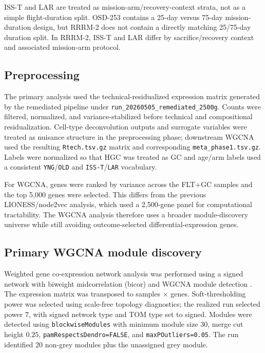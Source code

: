 \documentclass[11pt]{article}
\newcommand{\code}[1]{\texttt{#1}}
\newcommand{\pkg}[1]{\textsf{#1}}
\newcommand{\runid}{\code{run\_20260505\_remediated\_2500g}}
\begin{document}
ISS-T and LAR are treated as mission-arm/recovery-context strata, not as a simple flight-duration split. OSD-253 contains a 25-day versus 75-day mission-duration design, but RRRM-2 does not contain a directly matching 25/75-day duration split. In RRRM-2, ISS-T and LAR differ by sacrifice/recovery context and associated mission-arm protocol.

\subsection{Preprocessing}

The primary analysis used the technical-residualized expression matrix generated by the remediated pipeline under \runid. Counts were filtered, normalized, and variance-stabilized before technical and compositional residualization. Cell-type deconvolution outputs and surrogate variables were treated as nuisance structure in the preprocessing phase; downstream WGCNA used the resulting \code{Rtech.tsv.gz} matrix and corresponding \code{meta\_phase1.tsv.gz}. Labels were normalized so that HGC was treated as GC and age/arm labels used a consistent \code{YNG}/\code{OLD} and \code{ISS-T}/\code{LAR} vocabulary.

For WGCNA, genes were ranked by variance across the FLT+GC samples and the top 5,000 genes were selected. This differs from the previous LIONESS/node2vec analysis, which used a 2,500-gene panel for computational tractability. The WGCNA analysis therefore uses a broader module-discovery universe while still avoiding outcome-selected differential-expression genes.

\subsection{Primary WGCNA module discovery}

Weighted gene co-expression network analysis was performed using a signed network with biweight midcorrelation (\pkg{bicor}) and WGCNA module detection \citep{langfelder2008wgcna,langfelder2012fast}. The expression matrix was transposed to samples $\times$ genes. Soft-thresholding power was selected using scale-free topology diagnostics; the realized run selected power $7$, with signed network type and TOM type set to signed. Modules were detected using \code{blockwiseModules} with minimum module size $30$, merge cut height $0.25$, \code{pamRespectsDendro=FALSE}, and \code{maxPOutliers=0.05}. The run identified 20 non-grey modules plus the unassigned grey module.
\end{document}
